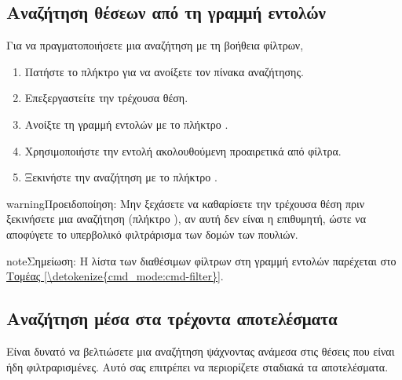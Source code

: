 \documentclass[letterpaper,10pt,greek]{sphinxmanual}
\begin{document}
\subsection{Αναζήτηση θέσεων από τη γραμμή εντολών}
\label{\detokenize{annexe_filtres:recherche-de-positions-en-ligne-de-commande}}
\sphinxAtStartPar
Για να πραγματοποιήσετε μια αναζήτηση με τη βοήθεια φίλτρων,
\begin{enumerate}
%
\item {} 
\sphinxAtStartPar
Πατήστε το πλήκτρο  για να ανοίξετε τον πίνακα αναζήτησης.

\item {} 
\sphinxAtStartPar
Επεξεργαστείτε την τρέχουσα θέση.

\item {} 
\sphinxAtStartPar
Ανοίξτε τη γραμμή εντολών με το πλήκτρο .

\item {} 
\sphinxAtStartPar
Χρησιμοποιήστε την εντολή  ακολουθούμενη προαιρετικά από φίλτρα.

\item {} 
\sphinxAtStartPar
Ξεκινήστε την αναζήτηση με το πλήκτρο .

\end{enumerate}

\begin{sphinxadmonition}{warning}{Προειδοποίηση:}
\sphinxAtStartPar
Μην ξεχάσετε να καθαρίσετε την τρέχουσα θέση πριν ξεκινήσετε μια αναζήτηση (πλήκτρο ), αν αυτή δεν είναι η επιθυμητή, ώστε να αποφύγετε το υπερβολικό φιλτράρισμα των δομών των πουλιών.
\end{sphinxadmonition}

\begin{sphinxadmonition}{note}{Σημείωση:}
\sphinxAtStartPar
Η λίστα των διαθέσιμων φίλτρων στη γραμμή εντολών παρέχεται στο \hyperref[\detokenize{cmd_mode:cmd-filter}]{Τομέας \ref{\detokenize{cmd_mode:cmd-filter}}}.
\end{sphinxadmonition}


\subsection{Αναζήτηση μέσα στα τρέχοντα αποτελέσματα}
\label{\detokenize{annexe_filtres:recherche-dans-les-resultats-courants}}
\sphinxAtStartPar
Είναι δυνατό να βελτιώσετε μια αναζήτηση ψάχνοντας ανάμεσα στις θέσεις που είναι ήδη φιλτραρισμένες. Αυτό σας επιτρέπει να περιορίζετε σταδιακά τα αποτελέσματα.
\end{document}
